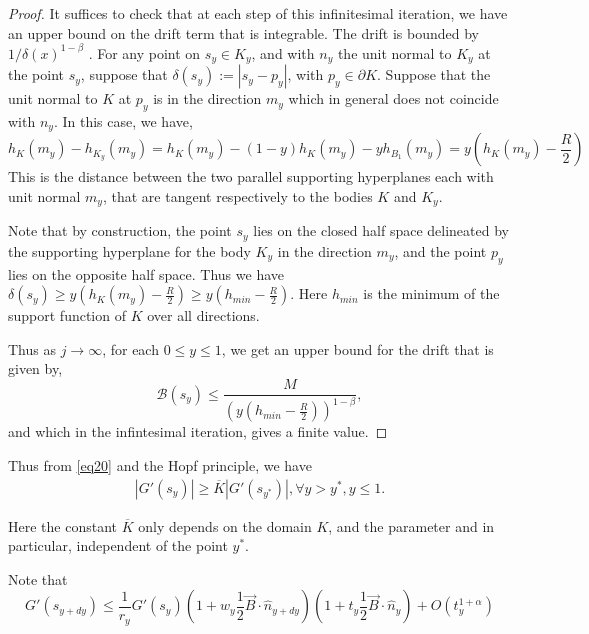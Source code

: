 \documentclass{article}
\theoremstyle{plain}
\theoremstyle{definition}
\theoremstyle{plain}
\newcommand{\B}{\mathcal{B}}
\begin{document}
\begin{proof}
    It suffices to check that at each step of this infinitesimal iteration, we have an upper bound on the drift term that is integrable. The drift is bounded by $1/\delta(x)^{1-\beta}$ . For any point on $s_y \in K_y$, and with $n_y$ the unit normal to $K_y$ at the point $s_y$, suppose that $\delta(s_y):=|s_y - p_y|$, with $p_y \in \partial K$. Suppose that the unit normal to $K$ at $p_y$ is in the direction $m_y$ which in general does not coincide with $n_y$. In this case, we have,
\begin{equation}
    h_{K}(m_y)-h_{K_y}(m_y)= h_{K}(m_y)- (1-y)h_{K}(m_y)-yh_{B_1}(m_y)=y(h_{K}(m_y)-\frac{R}{2})
\end{equation}
This is the distance between the two parallel supporting hyperplanes each with unit normal $m_y$, that are tangent respectively to the bodies $K$ and $K_y$. 

Note that by construction, the point $s_y$ lies on the closed half space delineated by the supporting hyperplane for the body $K_y$ in the direction $m_y$, and the point $p_y$ lies on the opposite half space. Thus we have $\delta(s_y)\geq y(h_{K}(m_y)-\frac{R}{2}) \geq y(h_{min} -\frac{R}{2})$. Here $h_{min}$ is the minimum of the support function of $K$ over all directions.

Thus as $j\to \infty$, for each $0\leq y\leq 1$, we get an upper bound for the drift that is given by,
\begin{equation}
    \B(s_y)\leq \frac{M}{(y(h_{min}-\frac{R}{2}))^{1-\beta}},
\end{equation}
and which in the infintesimal iteration, gives a finite value.

\end{proof}


Thus from \cref{eq20} and the Hopf principle, we have
\begin{align}\label{eq3000}
|G'(s_y)| \ge \overline{K} |G'(s_{y^*})|, \forall y > y^*, y\leq 1.
\end{align}


Here the constant $\overline{K}$ only depends on the domain $K$, and the parameter
and in particular,
independent of the point $y^*$.

Note that 
\begin{equation}G'(s_{y+dy}) \le \frac{1}{r_y} G'(s_y) \left( 1 + w_y \frac{1}{2} \vec{B} \cdot \hat{n}_{y+dy} \right) \left( 1 + t_y \frac{1}{2} \vec{B} \cdot \hat{n}_y \right) + O(t_y^{1+\alpha})\end{equation}
\end{document}
